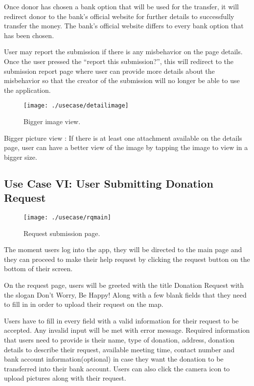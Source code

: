 \documentclass[conference]{IEEEtran}
\begin{document}
Once donor has chosen a bank option that will be used for the transfer, it will redirect donor to the bank’s official website for further details to successfully transfer the money. The bank’s official website differs to every bank option that has been chosen.

User may report the submission if there is any misbehavior on the page details. Once the user pressed the “report this submission?”, this will redirect to the submission report page where user can provide more details about the misbehavior so that the creator of the submission will no longer be able to use the application.

\begin{figure}[h!]
\texttt{[image: ./usecase/detailimage]}
\centering
\caption{Bigger image view.}
\end{figure}

Bigger picture view : If there is at least one attachment available on the details page, user can have a better view of the image by tapping the image to view in a bigger size. 



\subsection{Use Case VI: User Submitting Donation Request}
\begin{figure}[h!]
\texttt{[image: ./usecase/rqmain]}
\centering
\caption{Request submission page.}
\end{figure}
The moment users log into the app, they will be directed to the main page and they can proceed to make their help request by clicking the request button on the bottom of their screen.

On the request page, users will be greeted with the title Donation Request with the slogan Don’t Worry, Be Happy! Along with a few blank fields that they need to fill in in order to upload their request on the map.

Users have to fill in every field with a valid information for their request to be accepted. Any invalid input will be met with error message. Required information that users need to provide is their name, type of donation, address, donation details to describe their request, available meeting time, contact number and bank account information(optional) in case they want the donation to be transferred into their bank account. Users can also click the camera icon to upload pictures along with their request.
\end{document}
